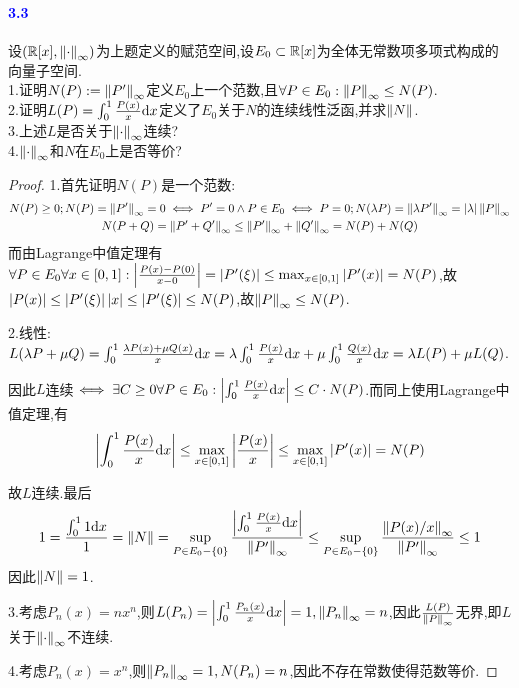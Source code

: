\documentclass[UTF8]{article}
\newcommand{\parablue}[1]{\paragraph*{\textcolor{blue}{#1}}}
\begin{document}
\parablue{3.3}设$(\mathbb{R}[x],\left\|\cdot\right\|_\infty)$为上题定义的赋范空间,设$E_0\subset \mathbb{R}[x]$为全体无常数项多项式构成的向量子空间.\\
1.证明$N(P):=\left\|P'\right\|_\infty$定义$E_0$上一个范数,且$\forall P\in E_0:\left\|P\right\|_\infty\leq N(P)$.\\
2.证明$L(P)=\int_0^1 \frac{P(x)}{x}\mathrm{d} x$定义了$E_0$关于$N$的连续线性泛函,并求$\left\|N\right\|$.\\
3.上述$L$是否关于$\left\|\cdot\right\|_\infty$连续?\\
4.$\left\|\cdot\right\|_\infty$和$N$在$E_0$上是否等价?

\begin{proof}
    1.首先证明$N(P)$是一个范数:$$\begin{gathered}
        N(P)\geq 0; N(P)=\left\|P'\right\|_\infty=0\iff P'=0\land P\in E_0\iff P=0;N(\lambda P)=\left\|\lambda P'\right\|_\infty=\left|\lambda\right|\left\|P\right\|_\infty\\
        N(P+Q)=\left\|P'+Q'\right\|_\infty\leq \left\|P'\right\|_\infty+\left\|Q'\right\|_\infty=N(P)+N(Q)
    \end{gathered}$$
    而由Lagrange中值定理有$\forall P\in E_0\forall x\in [0,1]:\left|\frac{P(x)-P(0)}{x-0}\right|=\left|P'(\xi)\right|\leq \max_{x\in [0,1]}\left|P'(x)\right|=N(P)$,故$\left|P(x)\right|\leq \left|P'(\xi)\right|\left|x\right|\leq \left|P'(\xi)\right|\leq N(P)$,故$\left\|P\right\|_\infty\leq N(P)$.

    2.线性:$L(\lambda P+\mu Q)=\int_0^1\frac{\lambda P(x)+\mu Q(x)}{x}\mathrm{d} x=\lambda\int_0^1 \frac{P(x)}{x}\mathrm{d} x+\mu\int_0^1\frac{Q(x)}{x}\mathrm{d} x=\lambda L(P)+\mu L(Q)$.

    因此$L$连续$\iff \exists C\geq 0\forall P\in E_0:\left|\int_0^1 \frac{P(x)}{x}\mathrm{d} x\right|\leq C\cdot N(P)$.而同上使用Lagrange中值定理,有$$\left|\int_0^1 \frac{P(x)}{x}\mathrm{d} x\right|\leq \max_{x\in [0,1]}\left|\frac{P(x)}{x}\right|\leq \max_{x\in [0,1]}\left|P'(x)\right|=N(P)$$

    故$L$连续.最后$$1=\frac{\int_0^1 1\mathrm{d} x}{1}=\left\|N\right\|=\sup_{P\in E_0-\left\{0\right\}}\frac{\left|\int_0^1 \frac{P(x)}{x}\mathrm{d} x\right|}{\left\|P'\right\|_\infty}\leq \sup_{P\in E_0-\left\{0\right\}}\frac{\left\|P(x)/x\right\|_\infty}{\left\|P'\right\|_\infty}\leq 1$$
    因此$\left\|N\right\|=1$.

    3.考虑$P_n(x)=nx^n$,则$L(P_n)=\left|\int_0^1 \frac{P_n(x)}{x}\mathrm{d} x\right|=1, \left\|P_n\right\|_\infty=n$,因此$\frac{L(P)}{\left\|P\right\|_\infty}$无界,即$L$关于$\left\|\cdot\right\|_\infty$不连续.

    4.考虑$P_n(x)=x^n$,则$\left\|P_n\right\|_\infty=1,N(P_n)=n$,因此不存在常数使得范数等价.
\end{proof}
\end{document}
